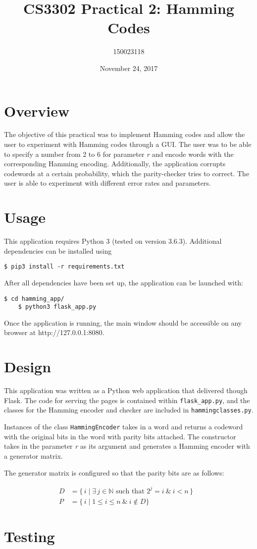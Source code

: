 \documentclass[11pt, oneside]{article}   	%
\title{CS3302 Practical 2: Hamming Codes}
\author{150023118}
\date{November 24, 2017}
\begin{document}
\maketitle
\section*{Overview}

The objective of this practical was to implement Hamming codes and allow the user to experiment with Hamming codes through a GUI. The user was to be able to specify a number from 2 to 6 for parameter \textit{r} and encode words with the corresponding Hamming encoding. Additionally, the application corrupts codewords at a certain probability, which the parity-checker tries to correct. The user is able to experiment with different error rates and parameters. 

\section*{Usage}

This application requires Python 3 (tested on version 3.6.3). Additional dependencies can be installed using

\begin{Verbatim}[tabsize=4]
	$ pip3 install -r requirements.txt
\end{Verbatim}

After all dependencies have been set up, the application can be launched with:

\begin{Verbatim}[tabsize=4]
	$ cd hamming_app/
	$ python3 flask_app.py
\end{Verbatim}

Once the application is running, the main window should be accessible on any browser at http://127.0.0.1:8080. 

\section*{Design}

This application was written as a Python web application that delivered though Flask. The code for serving the pages is contained within \verb!flask_app.py!, and the classes for the Hamming encoder and checker are included in \verb!hammingclasses.py!. 

Instances of the class \verb|HammingEncoder| takes in a word and returns a codeword with the original bits in the word with parity bits attached. The constructor takes in the parameter \textit{r} as its argument and generates a Hamming encoder with a generator matrix. 

The generator matrix is configured so that the parity bits are as follows:

\begin{align*}
D &= \{\,i \mid \exists \, j \in \mathbb{N} \text{ such that } 2^j = i \ \& \ i < n \, \} &\\
P &= \{\,i \mid 1 \leq i \leq n \ \& \  i \notin D \}
\end{align*}


\section*{Testing}
\end{document}
